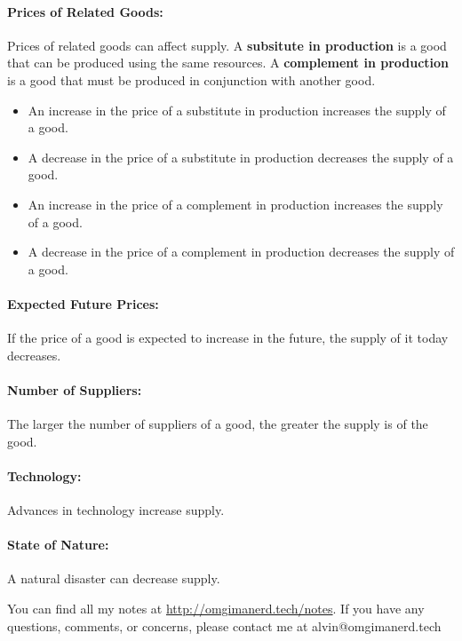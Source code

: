 \documentclass{article}
\begin{document}
\paragraph{Prices of Related Goods:}
Prices of related goods can affect supply. A \textbf{subsitute in production}
is a good that can be produced using the same resources. A \textbf{complement
in production} is a good that must be produced in conjunction with another
good.
\begin{itemize}
  \item An increase in the price of a substitute in production increases the
        supply of a good.
  \item A decrease in the price of a substitute in production decreases the
        supply of a good.
  \item An increase in the price of a complement in production increases the
        supply of a good.
  \item A decrease in the price of a complement in production decreases the
        supply of a good.
\end{itemize}

\paragraph{Expected Future Prices:}
If the price of a good is expected to increase in the future, the supply of it
today decreases.

\paragraph{Number of Suppliers:}
The larger the number of suppliers of a good, the greater the supply is of the
good.

\paragraph{Technology:}
Advances in technology increase supply.

\paragraph{State of Nature:}
A natural disaster can decrease supply.

\begin{center}
  You can find all my notes at \url{http://omgimanerd.tech/notes}. If you have
  any questions, comments, or concerns, please contact me at
  alvin@omgimanerd.tech
\end{center}
\end{document}
